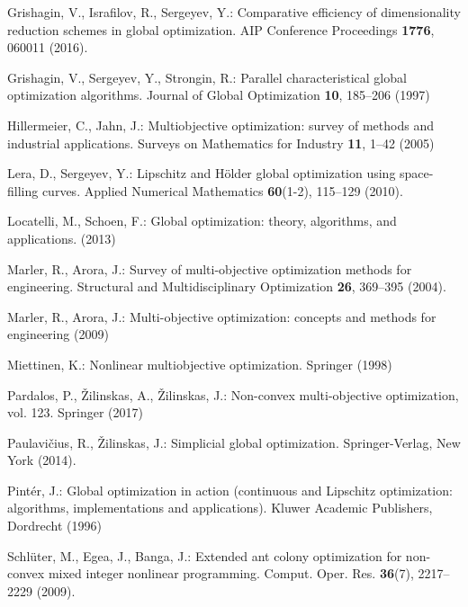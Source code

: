 \documentclass{svproc}
\begin{document}
\begin{thebibliography}{10}
Grishagin, V., Israfilov, R., Sergeyev, Y.: Comparative efficiency of
  dimensionality reduction schemes in global optimization.
\newblock AIP Conference Proceedings \textbf{1776}, 060011 (2016).
\newblock {}

Grishagin, V., Sergeyev, Y., Strongin, R.: Parallel characteristical global
  optimization algorithms.
\newblock Journal of Global Optimization \textbf{10}, 185--206 (1997)

Hillermeier, C., Jahn, J.: Multiobjective optimization: survey of methods and
  industrial applications.
\newblock Surveys on Mathematics for Industry \textbf{11}, 1--42 (2005)

Lera, D., Sergeyev, Y.: Lipschitz and {H}{\"o}lder global optimization using
  space-filling curves.
\newblock Applied Numerical Mathematics \textbf{60}(1-2), 115--129 (2010).
\newblock {}

Locatelli, M., Schoen, F.: Global optimization: theory, algorithms, and
  applications.
 (2013)

Marler, R., Arora, J.: Survey of multi-objective optimization methods for
  engineering.
\newblock Structural and Multidisciplinary Optimization \textbf{26}, 369--395
  (2004).
\newblock {}

Marler, R., Arora, J.: Multi-objective optimization: concepts and methods for
  engineering (2009)

Miettinen, K.: Nonlinear multiobjective optimization.
\newblock Springer (1998)

Pardalos, P., {\v Z}ilinskas, A., {\v Z}ilinskas, J.: Non-convex
  multi-objective optimization, vol. 123.
\newblock Springer (2017)

Paulavi{\v c}ius, R., {\v Z}ilinskas, J.: Simplicial global optimization.
\newblock Springer-Verlag, New York (2014).
\newblock {}

Pint\'er, J.: Global optimization in action (continuous and {Lipschitz}
  optimization: algorithms, implementations and applications).
\newblock Kluwer Academic Publishers, Dordrecht (1996)

Schl\"{u}ter, M., Egea, J., Banga, J.: Extended ant colony optimization for
  non-convex mixed integer nonlinear programming.
\newblock Comput. Oper. Res. \textbf{36}(7), 2217–2229 (2009).
\newblock {}


\end{thebibliography}
\end{document}

